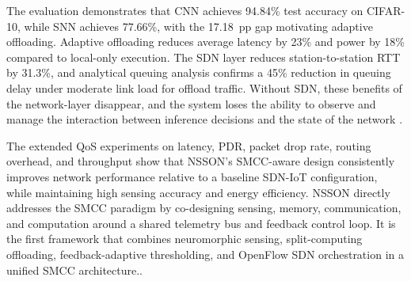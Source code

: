 \documentclass[journal]{IEEEtran}
\begin{document}
The evaluation demonstrates that CNN achieves 94.84\% test accuracy on
CIFAR-10, while SNN achieves 77.66\%, with the 17.18~pp gap motivating
adaptive offloading. Adaptive offloading reduces average latency by 23\%
and power by 18\% compared to local-only execution. The SDN layer reduces
station-to-station RTT by 31.3\%, and analytical queuing analysis confirms
a 45\% reduction in queuing delay under moderate link load for offload
traffic. Without SDN, these benefits of the network-layer disappear, and the
system loses the ability to observe and manage the interaction between
inference decisions and the state of the network \cite{kreutz2014software,mckeown2008openflow,gude2008nox,siddiqui2022toward,lo2023sdn}.

The extended QoS experiments on latency, PDR, packet drop rate, routing overhead, and throughput show that NSSON’s SMCC-aware design consistently improves network performance relative to a baseline SDN-IoT configuration, while maintaining high sensing accuracy and energy efficiency. NSSON directly addresses the SMCC paradigm by co-designing sensing,
memory, communication, and computation around a shared telemetry bus and
feedback control loop. It is the first framework that combines neuromorphic
sensing, split-computing offloading, feedback-adaptive thresholding, and
OpenFlow SDN orchestration in a unified SMCC architecture.\cite{10812728,9453402,chiang2023management}.



\end{document}
